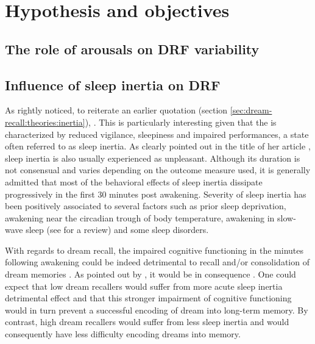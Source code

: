 %
\chapter{Hypothesis and objectives}
\label{sec:problematic}


\section{The role of arousals on DRF variability}
\label{sec:problematic:arousals}

\section{Influence of sleep inertia on DRF}
\label{sec:problematic:inertia}

As \citet{conduit_poor_2004} rightly noticed, to reiterate an earlier quotation (section \ref{sec:dream-recall:theories:inertia}), . This is particularly interesting given that the  is characterized by reduced vigilance, sleepiness and impaired performances, a state often referred to as sleep inertia. As \citet{trotti_waking_2016} clearly pointed out in the title of her article , sleep inertia is also usually experienced as unpleasant. Although its duration is not consensual and varies depending on the outcome measure used, it is generally admitted that most of the behavioral effects of sleep inertia dissipate progressively in the first 30 minutes post awakening. Severity of sleep inertia has been positively associated to several factors such as prior sleep deprivation, awakening near the circadian trough of body temperature, awakening in slow-wave sleep (see \citealp{tassi_sleep_2000} for a review) and some sleep disorders.

With regards to dream recall, the impaired cognitive functioning in the minutes following awakening could be indeed detrimental to recall and/or consolidation of dream memories \citep{conduit_poor_2004}. As pointed out by \citet{schredl_factors_2003}, it would be in consequence . One could expect that low dream recallers would suffer from more acute sleep inertia detrimental effect and that this stronger impairment of cognitive functioning would in turn prevent a successful encoding of dream into long-term memory. By contrast, high dream recallers would suffer from less sleep inertia and would consequently have less difficulty encoding dreams into memory.

